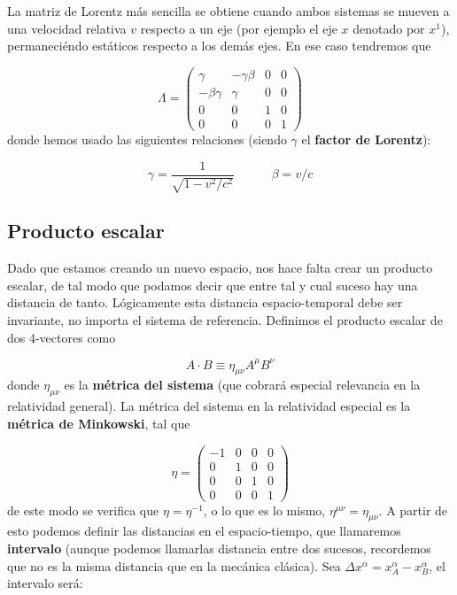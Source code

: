 \documentclass[12pt,a4paper]{book}
\numberwithin{equation}{section}
\numberwithin{figure}{section}
\newcommand{\tquad}{\quad \quad \quad}
\begin{document}
La matriz de Lorentz más sencilla se obtiene cuando ambos sistemas se mueven a una velocidad relativa $v$ respecto a un eje (por ejemplo el eje $x$ denotado por $x^1$), permaneciéndo estáticos respecto a los demás ejes. En ese caso tendremos que

\begin{equation}
\Lambda = \begin{pmatrix}
\gamma & - \gamma \beta & 0 & 0 \\
 - \beta \gamma &  \gamma  & 0 & 0 \\
0 & 0  & 1 & 0 \\
0 & 0  & 0 & 1
\end{pmatrix}
\end{equation}
donde hemos usado las siguientes relaciones (siendo $\gamma$ el \textbf{factor de Lorentz}):

\begin{equation}
\gamma = \frac{1}{\sqrt{1-v^2/c^2}} \tquad \beta = v/c
\end{equation}

\subsection{Producto escalar}

Dado que estamos creando un nuevo espacio, nos hace falta crear un producto escalar, de tal modo que podamos decir que entre tal y cual suceso hay una distancia de tanto. Lógicamente esta distancia espacio-temporal debe ser invariante, no importa el sistema de referencia. Definimos el producto escalar de dos 4-vectores como

\begin{equation}
A \cdot B \equiv \eta_{\mu \nu} A^{\mu}  B^{\nu}
\end{equation}
donde $\eta_{\mu \nu}$ es la \textbf{métrica del sistema} (que cobrará especial relevancia en la relatividad general). La métrica del sistema en la relatividad especial es la \textbf{métrica de Minkowski}, tal que 


\begin{equation}
\eta = \begin{pmatrix}
-1 & 0 & 0 & 0 \\
 0 &  1  & 0 & 0 \\
0 & 0  & 1 & 0 \\
0 & 0  & 0 & 1
\end{pmatrix}
\end{equation}
de este modo se verifica que $\eta = \eta^{-1}$, o lo que es lo mismo, $\eta^{\mu \nu} = \eta_{\mu \nu}$. A partir de esto podemos definir las distancias en el espacio-tiempo, que llamaremos \textbf{intervalo} (aunque podemos llamarlas distancia entre dos sucesos, recordemos que no es la misma distancia que en la mecánica clásica). Sea $\Delta x^{\alpha} = x_A^{\alpha}-x_B^{\alpha}$, el intervalo será:
\end{document}
